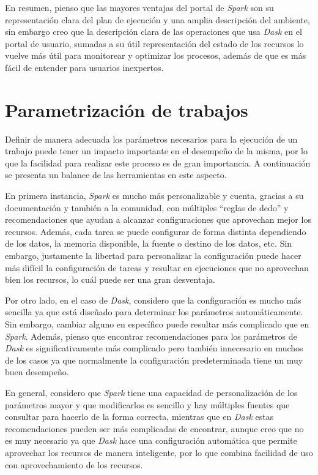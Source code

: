 En resumen, pienso que las mayores ventajas del portal de \textit{Spark} son su representación clara del plan de ejecución y una amplia descripción del ambiente, sin embargo creo que la descripción clara de las operaciones que usa \textit{Dask} en el portal de usuario, sumadas a su útil representación del estado de los recursos lo vuelve más útil para monitorear y optimizar los procesos, además de que es más fácil de entender para usuarios inexpertos.


\section{Parametrización de trabajos}

Definir de manera adecuada los parámetros necesarios para la ejecución de un trabajo puede tener un impacto importante en el desempeño de la misma, por lo que la facilidad para realizar este proceso es de gran importancia. A continuación se presenta un balance de las herramientas en este aspecto.

En primera instancia, \textit{Spark} es mucho más personalizable y cuenta, gracias a su documentación y también a la comunidad, con múltiples ``reglas de dedo'' y recomendaciones que ayudan a alcanzar configuraciones que aprovechan mejor los recursos. Además, cada tarea se puede configurar de forma distinta dependiendo de los datos, la memoria disponible, la fuente o destino de los datos, etc. Sin embargo, justamente la libertad para personalizar la configuración puede hacer más difícil la configuración de tareas y resultar en ejecuciones que no aprovechan bien los recursos, lo cuál puede ser una gran desventaja.

Por otro lado, en el caso de \textit{Dask}, considero que la configuración es mucho más sencilla ya que está diseñado para determinar los parámetros automáticamente. Sin embargo, cambiar alguno en específico puede resultar más complicado que en \textit{Spark}. Además, pienso que encontrar recomendaciones para los parámetros de \textit{Dask} es significativamente más complicado pero también innecesario en muchos de los casos ya que normalmente la configuración predeterminada tiene un muy buen desempeño.

En general, considero que \textit{Spark} tiene una capacidad de personalización de los parámetros mayor y que modificarlos es sencillo y hay múltiples fuentes que consultar para hacerlo de la forma correcta, mientras que en \textit{Dask} estas recomendaciones pueden ser más complicadas de encontrar, aunque creo que no es muy necesario ya que \textit{Dask} hace una configuración automática que permite aprovechar los recursos de manera inteligente, por lo que combina facilidad de uso con aprovechamiento de los recursos.

